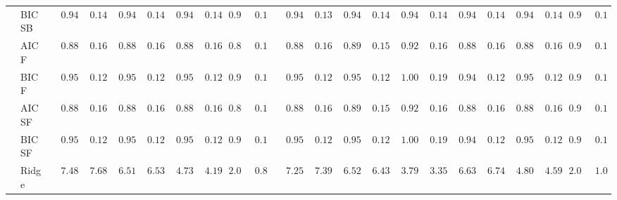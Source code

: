 \documentclass{article}
\begin{document}
\begin{tabular}{ll|ll|llllll|llllll|llllll}
 & BIC SB  & $\phantom{00}0.94$ & $\phantom{00}0.14$ & $\phantom{00}0.94$ & $\phantom{00}0.14$ & $\phantom{00}0.94$ & $\phantom{00}0.14$ & $\phantom{0}0.95$ & $\phantom{0}0.14$ & $\phantom{00}0.94$ & $\phantom{00}0.13$ & $\phantom{00}0.94$ & $\phantom{00}0.14$ & $\phantom{00}0.94$ & $\phantom{00}0.14$ & $\phantom{00}0.94$ & $\phantom{00}0.14$ & $\phantom{00}0.94$ & $\phantom{00}0.14$ & $\phantom{0}0.95$ & $\phantom{0}0.14$ \\
 & AIC F  & $\phantom{00}0.88$ & $\phantom{00}0.16$ & $\phantom{00}0.88$ & $\phantom{00}0.16$ & $\phantom{00}0.88$ & $\phantom{00}0.16$ & $\phantom{0}0.88$ & $\phantom{0}0.16$ & $\phantom{00}0.88$ & $\phantom{00}0.16$ & $\phantom{00}0.89$ & $\phantom{00}0.15$ & $\phantom{00}0.92$ & $\phantom{00}0.16$ & $\phantom{00}0.88$ & $\phantom{00}0.16$ & $\phantom{00}0.88$ & $\phantom{00}0.16$ & $\phantom{0}0.91$ & $\phantom{0}0.15$ \\
 & BIC F  & $\phantom{00}0.95$ & $\phantom{00}0.12$ & $\phantom{00}0.95$ & $\phantom{00}0.12$ & $\phantom{00}0.95$ & $\phantom{00}0.12$ & $\phantom{0}0.95$ & $\phantom{0}0.12$ & $\phantom{00}0.95$ & $\phantom{00}0.12$ & $\phantom{00}0.95$ & $\phantom{00}0.12$ & $\phantom{00}1.00$ & $\phantom{00}0.19$ & $\phantom{00}0.94$ & $\phantom{00}0.12$ & $\phantom{00}0.95$ & $\phantom{00}0.12$ & $\phantom{0}0.97$ & $\phantom{0}0.15$ \\
 & AIC SF  & $\phantom{00}0.88$ & $\phantom{00}0.16$ & $\phantom{00}0.88$ & $\phantom{00}0.16$ & $\phantom{00}0.88$ & $\phantom{00}0.16$ & $\phantom{0}0.88$ & $\phantom{0}0.16$ & $\phantom{00}0.88$ & $\phantom{00}0.16$ & $\phantom{00}0.89$ & $\phantom{00}0.15$ & $\phantom{00}0.92$ & $\phantom{00}0.16$ & $\phantom{00}0.88$ & $\phantom{00}0.16$ & $\phantom{00}0.88$ & $\phantom{00}0.16$ & $\phantom{0}0.91$ & $\phantom{0}0.15$ \\
 & BIC SF  & $\phantom{00}0.95$ & $\phantom{00}0.12$ & $\phantom{00}0.95$ & $\phantom{00}0.12$ & $\phantom{00}0.95$ & $\phantom{00}0.12$ & $\phantom{0}0.95$ & $\phantom{0}0.12$ & $\phantom{00}0.95$ & $\phantom{00}0.12$ & $\phantom{00}0.95$ & $\phantom{00}0.12$ & $\phantom{00}1.00$ & $\phantom{00}0.19$ & $\phantom{00}0.94$ & $\phantom{00}0.12$ & $\phantom{00}0.95$ & $\phantom{00}0.12$ & $\phantom{0}0.97$ & $\phantom{0}0.15$ \\
 & Ridge  & $\phantom{00}7.48$ & $\phantom{00}7.68$ & $\phantom{00}6.51$ & $\phantom{00}6.53$ & $\phantom{00}4.73$ & $\phantom{00}4.19$ & $\phantom{0}2.09$ & $\phantom{0}0.84$ & $\phantom{00}7.25$ & $\phantom{00}7.39$ & $\phantom{00}6.52$ & $\phantom{00}6.43$ & $\phantom{00}3.79$ & $\phantom{00}3.35$ & $\phantom{00}6.63$ & $\phantom{00}6.74$ & $\phantom{00}4.80$ & $\phantom{00}4.59$ & $\phantom{0}2.08$ & $\phantom{0}1.05$ \\

\end{tabular}
\end{document}
